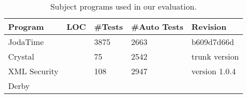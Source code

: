 
\begin{table}
\centering
\setlength{\tabcolsep}{0.5\tabcolsep}
\begin{tabular}{|l|l|l|l|l|}
\hline
\textbf{Program} & \textbf{LOC} & \textbf{\#Tests} & \textbf{\#Auto Tests} & \textbf{Revision}
\\
\hline
JodaTime & & 3875 
& 2663 &  b609d7d66d\\
Crystal & & 75 & 2542 & trunk version\\
XML Security & & 108 & 2947 & version 1.0.4 \\ 
Derby & &  & &  \\ 
\hline
\end{tabular}
\caption{Subject programs used in our evaluation. 
}
\label{tab:subjects}
\end{table}
